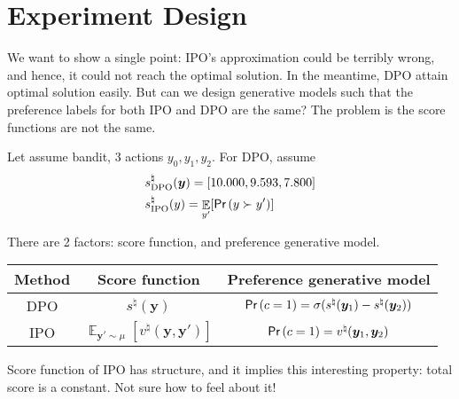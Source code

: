 \documentclass[11pt,a4paper]{article}
\begin{document}
\section{Experiment Design}%
\label{sec:experiment_design}

We want to show a single point: IPO's approximation could be terribly wrong, and hence, it could not reach the optimal solution. In the meantime, DPO attain optimal solution easily.
But can we design generative models such that the preference labels for both IPO and DPO are the same? The problem is the score functions are not the same.

Let assume bandit, 3 actions $y_0, y_1, y_2$.
For DPO, assume 
\begin{align}
&s^{\natural}_{\rm DPO}(\bm{y}) = [10.000, 9.593, 7.800] \\
&s^{\natural}_{\rm IPO}(y) = \mathop{\mathbb{E}}_{y'} [\textsf{Pr}\left(y \succ y'\right)]
\end{align}


There are 2 factors: score function, and preference generative model.

\begin{table}[ht]
    \centering
    \begin{tabular}{|c|c|c|}
        \hline
        Method & Score function & Preference generative model \\ \hline \hline
        DPO & $s^{\natural}(\bm{y})$ & $\textsf{Pr}\left(c=1\right) = \sigma(s^{\natural}(\bm{y}_1) - s^{\natural}(\bm{y}_2))$ \\ \hline
        IPO & $ \mathop{\mathbb{E}}_{\bm{y}' \sim \mu}[v^{\natural}(\bm{y}, \bm{y}')]$ & $\textsf{Pr}\left(c=1\right) = v^{\natural}(\bm{y}_1, \bm{y}_2)$ \\ \hline
    \end{tabular}
\end{table}
Score function of IPO has structure, and it implies this interesting property: total score is a constant. Not sure how to feel about it!
\end{document}

